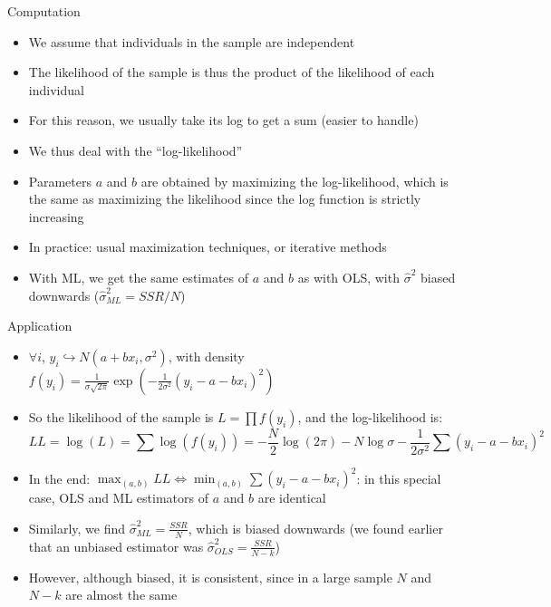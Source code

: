 \documentclass[aspectratio=169]{beamer}
\begin{document}
\begin{frame}{Computation}
\begin{itemize}
    \item We assume that individuals in the sample are independent
    \item The likelihood of the sample is thus the product of the likelihood of each individual
    \item For this reason, we usually take its log to get a sum (easier to handle)
    \item We thus deal with the ``log-likelihood''
    \item Parameters $a$ and $b$ are obtained by maximizing the log-likelihood, which is the same as maximizing the likelihood since the log function is strictly increasing
    \item In practice: usual maximization techniques, or iterative methods
    \item With ML, we get the same estimates of $a$ and $b$ as with OLS, with $\hat{\sigma}^2$ biased downwards ($\hat{\sigma}^2_{ML} = SSR/N$)
\end{itemize}
\end{frame}

\begin{frame}{Application}
\begin{itemize}
    \item $\forall i$, $y_i \hookrightarrow N(a + bx_i, \sigma^2)$, with density $f(y_i) = \frac{1}{\sigma\sqrt{2\pi}} \exp\left(-\frac{1}{2\sigma^2}(y_i - a - bx_i)^2\right)$
    \item So the likelihood of the sample is $L = \prod f(y_i)$, and the log-likelihood is:
    \[LL = \log(L) = \sum \log(f(y_i)) = -\frac{N}{2}\log(2\pi) - N\log\sigma - \frac{1}{2\sigma^2}\sum(y_i - a - bx_i)^2\]
    \item In the end: $\max_{(a,b)} LL \Longleftrightarrow \min_{(a,b)} \sum(y_i - a - bx_i)^2$: in this special case, OLS and ML estimators of $a$ and $b$ are identical
    \item Similarly, we find $\hat{\sigma}^2_{ML} = \frac{SSR}{N}$, which is biased downwards (we found earlier that an unbiased estimator was $\hat{\sigma}^2_{OLS} = \frac{SSR}{N-k}$)
    \item However, although biased, it is consistent, since in a large sample $N$ and $N-k$ are almost the same
\end{itemize}
\end{frame}
\end{document}
